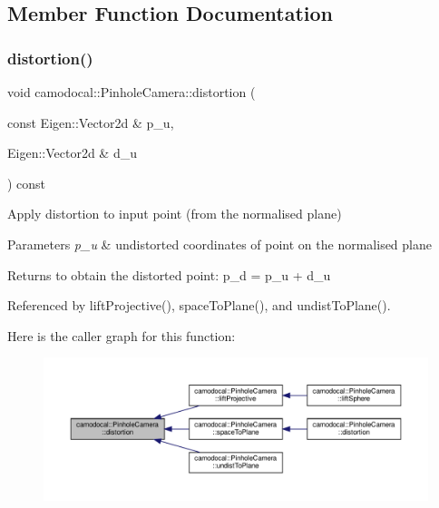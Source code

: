 \subsection{Member Function Documentation}
\mbox{\label{classcamodocal_1_1PinholeCamera_a0e667305df17c681a6550cd0addfcaab}} 
\subsubsection{\texorpdfstring{distortion()}{distortion()}\hspace{0.1cm}{\footnotesize\ttfamily [1/2]}}
{\footnotesize\ttfamily void camodocal\+::\+Pinhole\+Camera\+::distortion (\begin{DoxyParamCaption}\item[{const Eigen\+::\+Vector2d \&}]{p\+\_\+u,  }\item[{Eigen\+::\+Vector2d \&}]{d\+\_\+u }\end{DoxyParamCaption}) const}



Apply distortion to input point (from the normalised plane) 


\begin{DoxyParams}{Parameters}
{\em p\+\_\+u} & undistorted coordinates of point on the normalised plane \\
\hline
\end{DoxyParams}
\begin{DoxyReturn}{Returns}
to obtain the distorted point\+: p\+\_\+d = p\+\_\+u + d\+\_\+u 
\end{DoxyReturn}


Referenced by lift\+Projective(), space\+To\+Plane(), and undist\+To\+Plane().

Here is the caller graph for this function\+:\nopagebreak
\begin{figure}[H]
\begin{center}
\leavevmode
\includegraphics[width=350pt]{classcamodocal_1_1PinholeCamera_a0e667305df17c681a6550cd0addfcaab_icgraph}
\end{center}
\end{figure}
\mbox{\label{classcamodocal_1_1PinholeCamera_a36fbf4d157d3dafd87dc52c8f664bcbc}} 
